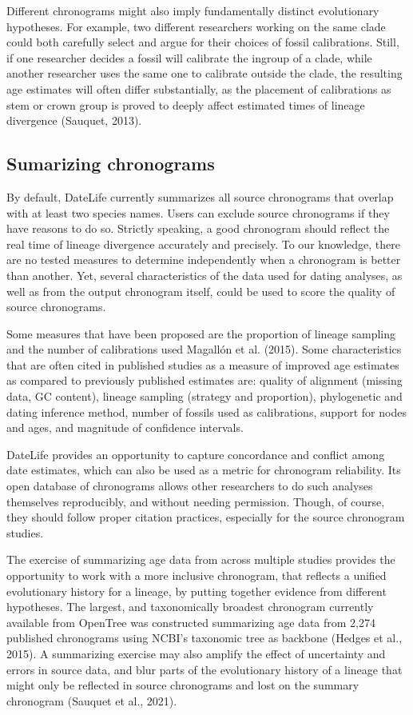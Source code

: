 \documentclass[
  man]{apa6}
\begin{document}
Different chronograms might also imply fundamentally distinct evolutionary hypotheses.
For example, two different researchers working on the same clade could both carefully select and argue for their choices of fossil calibrations.
Still, if one researcher decides a fossil will calibrate the ingroup of a clade, while another researcher uses the same one to calibrate outside the clade, the resulting age estimates will often differ substantially, as the placement of calibrations as stem or crown group is proved to deeply affect estimated times of lineage divergence (Sauquet, 2013).

\hypertarget{sumarizing-chronograms}{%
\subsection{Sumarizing chronograms}\label{sumarizing-chronograms}}

By default, DateLife currently summarizes all source chronograms that overlap with at least two species names. Users can exclude source chronograms if they have reasons to do so.
Strictly speaking, a good chronogram should reflect the real time of lineage divergence accurately and precisely.
To our knowledge, there are no tested measures to determine independently when a chronogram is better than another. Yet, several characteristics of the data used for dating analyses, as well as from the output chronogram itself, could be used to score the quality of source chronograms.

Some measures that have been proposed are the proportion of lineage sampling and the number of calibrations used Magallón et al. (2015).
Some characteristics that are often cited in published studies as a measure of improved age estimates as compared to previously published estimates are: quality of alignment (missing data, GC content), lineage sampling (strategy and proportion), phylogenetic and dating inference method, number of fossils used as calibrations, support for nodes and ages, and magnitude of confidence intervals.

DateLife provides an opportunity to capture concordance and conflict among date estimates, which can also be used as a metric for chronogram reliability.
Its open database of chronograms allows other researchers to do such analyses themselves reproducibly, and without needing permission. Though, of course, they should follow proper citation practices, especially for the source chronogram studies.

The exercise of summarizing age data from across multiple studies provides the opportunity to work with a more inclusive chronogram,
that reflects a unified evolutionary history for a lineage, by putting together evidence from different hypotheses.
The largest, and taxonomically broadest chronogram currently available from OpenTree was constructed summarizing age data from 2,274 published chronograms using NCBI's taxonomic tree as backbone (Hedges et al., 2015).
A summarizing exercise may also amplify the effect of uncertainty and errors in source data, and blur parts of the evolutionary history of a lineage that might only be reflected in source chronograms and lost on the summary chronogram (Sauquet et al., 2021).
\end{document}
